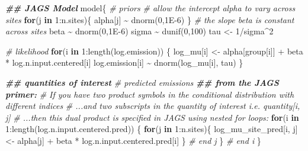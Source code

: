 \documentclass[
]{article}
\newenvironment{Shaded}{\begin{snugshade}}{\end{snugshade}}
\newcommand{\CommentTok}[1]{\textcolor[rgb]{0.56,0.35,0.01}{\textit{#1}}}
\newcommand{\ControlFlowTok}[1]{\textcolor[rgb]{0.13,0.29,0.53}{\textbf{#1}}}
\newcommand{\DecValTok}[1]{\textcolor[rgb]{0.00,0.00,0.81}{#1}}
\newcommand{\DocumentationTok}[1]{\textcolor[rgb]{0.56,0.35,0.01}{\textbf{\textit{#1}}}}
\newcommand{\FloatTok}[1]{\textcolor[rgb]{0.00,0.00,0.81}{#1}}
\newcommand{\FunctionTok}[1]{\textcolor[rgb]{0.00,0.00,0.00}{#1}}
\newcommand{\NormalTok}[1]{#1}
\newcommand{\OtherTok}[1]{\textcolor[rgb]{0.56,0.35,0.01}{#1}}
\newcommand{\SpecialCharTok}[1]{\textcolor[rgb]{0.00,0.00,0.00}{#1}}
\begin{document}
\begin{Shaded}
\begin{Highlighting}[]
\DocumentationTok{\#\# JAGS Model}
\NormalTok{model\{}
  \CommentTok{\# priors}
  \CommentTok{\# allow the intercept alpha to vary across sites}
    \ControlFlowTok{for}\NormalTok{(j }\ControlFlowTok{in} \DecValTok{1}\SpecialCharTok{:}\NormalTok{n.sites)\{}
\NormalTok{      alpha[j] }\SpecialCharTok{\textasciitilde{}} \FunctionTok{dnorm}\NormalTok{(}\DecValTok{0}\NormalTok{,}\FloatTok{1E{-}6}\NormalTok{) }
\NormalTok{    \}}
  \CommentTok{\# the slope beta is constant across sites}
\NormalTok{  beta }\SpecialCharTok{\textasciitilde{}} \FunctionTok{dnorm}\NormalTok{(}\DecValTok{0}\NormalTok{,}\FloatTok{1E{-}6}\NormalTok{)}
\NormalTok{  sigma }\SpecialCharTok{\textasciitilde{}} \FunctionTok{dunif}\NormalTok{(}\DecValTok{0}\NormalTok{,}\DecValTok{100}\NormalTok{)}
\NormalTok{  tau }\OtherTok{\textless{}{-}} \DecValTok{1}\SpecialCharTok{/}\NormalTok{sigma}\SpecialCharTok{\^{}}\DecValTok{2}

  \CommentTok{\# likelihood}
  \ControlFlowTok{for}\NormalTok{(i }\ControlFlowTok{in} \DecValTok{1}\SpecialCharTok{:}\FunctionTok{length}\NormalTok{(log.emission)) \{}
\NormalTok{    log\_mu[i] }\OtherTok{\textless{}{-}}\NormalTok{ alpha[group[i]] }\SpecialCharTok{+}\NormalTok{ beta }\SpecialCharTok{*}\NormalTok{ log.n.input.centered[i]}
\NormalTok{    log.emission[i] }\SpecialCharTok{\textasciitilde{}} \FunctionTok{dnorm}\NormalTok{(log\_mu[i], tau)}
\NormalTok{  \}}

  \DocumentationTok{\#\# quantities of interest}
    \CommentTok{\# predicted emissions}
    \DocumentationTok{\#\# from the JAGS primer: }
      \CommentTok{\# If you have two product symbols in the conditional distribution with different indices}
        \CommentTok{\# ...and two subscripts in the quantity of interest i.e. quantity[i, j] }
        \CommentTok{\# ...then this dual product is specified in JAGS using nested for loops:}
    \ControlFlowTok{for}\NormalTok{(i }\ControlFlowTok{in} \DecValTok{1}\SpecialCharTok{:}\FunctionTok{length}\NormalTok{(log.n.input.centered.pred)) \{}
      \ControlFlowTok{for}\NormalTok{(j }\ControlFlowTok{in} \DecValTok{1}\SpecialCharTok{:}\NormalTok{n.sites)\{}
\NormalTok{        log\_mu\_site\_pred[i, j] }\OtherTok{\textless{}{-}}\NormalTok{ alpha[j] }\SpecialCharTok{+}\NormalTok{ beta }\SpecialCharTok{*}\NormalTok{ log.n.input.centered.pred[i]}
\NormalTok{      \} }\CommentTok{\# end j}
\NormalTok{    \} }\CommentTok{\# end i}
\NormalTok{\}}
\end{Highlighting}
\end{Shaded}
\end{document}
